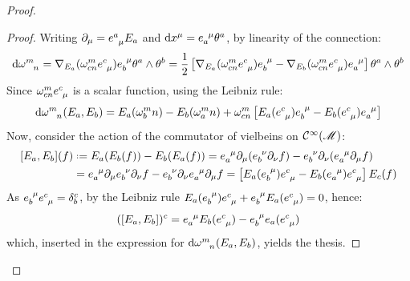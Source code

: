 \begin{proofbox}
\begin{proof}
    \begin{proofbox}
      \begin{proof}
        Writing $ \pa_\mu = \tensor{e}{^a_\mu} E_a $ and $ \dd x^\mu = \tensor{e}{_a^\mu} \theta^a $, by linearity of the connection:
        \begin{equation*}
          \dd \tensor{\omega}{^m_n} = \na_{E_a} (\omega^m_{cn} \tensor{e}{^c_\mu}) \tensor{e}{_b^\mu} \theta^a \wedge \theta^b = \frac{1}{2} \left[ \na_{E_a} (\omega^m_{cn} \tensor{e}{^c_\mu}) \tensor{e}{_b^\mu} - \na_{E_b} (\omega^m_{cn} \tensor{e}{^c_\mu}) \tensor{e}{_a^\mu} \right] \theta^a \wedge \theta^b
        \end{equation*}
        Since $ \omega^m_{cn} \tensor{e}{^c_\mu} $ is a scalar function, using the Leibniz rule:
        \begin{equation*}
          \dd \tensor{\omega}{^m_n}(E_a , E_b) = E_a(\omega^m_bn) - E_b(\omega^m_an) + \omega^m_{cn} \left[ E_a(\tensor{e}{^c_\mu}) \tensor{e}{_b^\mu} - E_b(\tensor{e}{^c_\mu}) \tensor{e}{_a^\mu} \right]
        \end{equation*}
        Now, consider the action of the commutator of vielbeins on $ \mathcal{C}^{\infty}(\mathscr{M}) $:
        \begin{equation*}
          \begin{split}
            [E_a , E_b](f)
            & \defeq E_a(E_b(f)) - E_b(E_a(f)) = \tensor{e}{_a^\mu} \pa_\mu (\tensor{e}{_b^\nu} \pa_\nu f) - \tensor{e}{_b^\nu} \pa_\nu (\tensor{e}{_a^\mu} \pa_\mu f) \\
            & = \tensor{e}{_a^\mu} \pa_\mu \tensor{e}{_b^\nu} \pa_\nu f - \tensor{e}{_b^\nu} \pa_\nu \tensor{e}{_a^\mu} \pa_\mu f = \left[ E_a(\tensor{e}{_b^\mu}) \tensor{e}{^c_\mu} - E_b(\tensor{e}{_a^\mu}) \tensor{e}{^c_\mu} \right] E_c(f) \\
          \end{split}
        \end{equation*}
        As $ \tensor{e}{_b^\mu} \tensor{e}{^c_\mu} = \delta^c_b $, by the Leibniz rule $ E_a(\tensor{e}{_b^\mu}) \tensor{e}{^c_\mu} + \tensor{e}{_b^\mu} E_a(\tensor{e}{^c_\mu}) = 0 $, hence:
        \begin{equation}
          ([E_a , E_b])^c = \tensor{e}{_a^\mu} E_b(\tensor{e}{^c_\mu}) - \tensor{e}{_b^\mu} e_a(\tensor{e}{^c_\mu})
        \end{equation}
        which, inserted in the expression for $ \dd \tensor{\omega}{^m_n}(E_a , E_b) $, yields the thesis.
      \end{proof}
    \end{proofbox}


\end{proof}
\end{proofbox}
